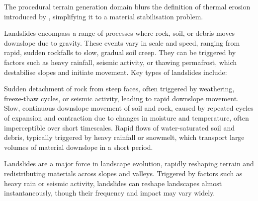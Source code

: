 
The procedural terrain generation domain blurs the definition of thermal erosion introduced by \cite{Musgrave1989}, simplifying it to a material stabilisation problem. 

Landslides encompass a range of processes where rock, soil, or debris moves downslope due to gravity. These events vary in scale and speed, ranging from rapid, sudden rockfalls to slow, gradual soil creep. They can be triggered by factors such as heavy rainfall, seismic activity, or thawing permafrost, which destabilise slopes and initiate movement. Key types of landslides include:
\begin{Itemize}
     Sudden detachment of rock from steep faces, often triggered by weathering, freeze-thaw cycles, or seismic activity, leading to rapid downslope movement. 
     Slow, continuous downslope movement of soil and rock, caused by repeated cycles of expansion and contraction due to changes in moisture and temperature, often imperceptible over short timescales.
     Rapid flows of water-saturated soil and debris, typically triggered by heavy rainfall or snowmelt, which transport large volumes of material downslope in a short period.
\end{Itemize}

Landslides are a major force in landscape evolution, rapidly reshaping terrain and redistributing materials across slopes and valleys. Triggered by factors such as heavy rain or seismic activity, landslides can reshape landscapes almost instantaneously, though their frequency and impact may vary widely.

